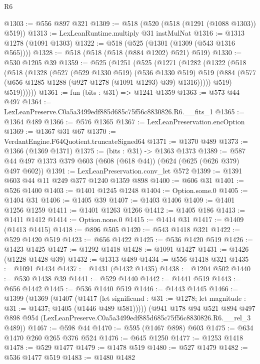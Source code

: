 \begin{lexlean}{R6}
\begin{coremodule}
@1303 := @556 @897 @321
@1309 := @518 (@520 (@518 (@1291 (@1088 @1303)) @519))
@1313 := LexLeanRuntime.multiply @31 instMulNat
@1316 := @1313 @1278 (@1091 @1303)
@1322 := @518 (@525 (@1301 (@1309 (@543 @1316 @565))))
@1328 := @518 (@518 (@518 (@884 @1202) @521) @519)
@1330 := @530 @1205 @39
@1359 := @525
    (@1251
      (@525
        (@1271
          (@1282
            (@1322
              (@518
                (@518
                  (@1328
                    (@527
                      (@529 @1330 @519)
                      (@536 @1330 @519)
                      @519
                      (@884 (@577 (@656 @1285 @1288 (@927 @1278 (@1091 @1293) @39) @1316)))))
                  @519)
                @519))))))
@1361 := fun (bits : @31) => @1241 @1359
@1363 := @573 @44 @497
@1364 := LexLeanPreserve.C0a5a3499edf885d685c75f56c8830826.R6.__fits_1
@1365 := @1364 @489
@1366 := @576 @1365
@1367 := LexLeanPreservation.encOption
@1369 := @1367 @31 @67
@1370 := VerdantEngine.F64Quotient.truncateSigned64
@1371 := @1370 @489
@1373 := @1366 (@1369 @1371)
@1375 := (bits : @31) -> @1363 @1373
@1389 := @587 @44 @497 @1373 @379 @603 (@608 (@618 @44)) (@624 (@625 (@626 @379) @497 @602))
@1391 := LexLeanPreservation.conv_let @572
@1399 := @1391 @603 @44 @11 @249 @377 @1240 @1359 @898
@1400 := @606 @31
@1401 := @526 @1400
@1403 := @1401 @1245 @1248
@1404 := Option.some.{0}
@1405 := @1404 @31
@1406 := @1405 @39
@1407 := @1403 @1406
@1409 := @1401 @1256 @1259
@1411 := @1401 @1263 @1266
@1412 := @1405 @186
@1413 := @1411 @1412
@1414 := Option.none.{0}
@1415 := @1414 @31
@1417 := @1409 (@1413 @1415)
@1418 := @896 @505
@1420 := @543 @1418 @321
@1422 := @529 @1420 @519
@1423 := @656 @1422
@1425 := @536 @1420 @519
@1426 := @1423 @1425
@1427 := @1292 @1418
@1428 := @1091 @1427
@1431 := @1426 (@1228 @1428 @39)
@1432 := @1313 @489
@1434 := @556 @1418 @321
@1435 := @1091 @1434
@1437 := @1431 (@1432 @1435)
@1438 := @1204 @502
@1440 := @530 @1438 @39
@1441 := @529 @1440
@1442 := @1441 @519
@1443 := @656 @1442
@1445 := @536 @1440 @519
@1446 := @1443 @1445
@1466 := @1399
    (@1369
      (@1407
        (@1417
          (let significand : @31 := @1278; let magnitude : @31 := @1437; @1405 (@1446 @489 @581)))))
    (@941
      @178
      @94
      @521
      @894
      @497
      @898
      @954
      (LexLeanPreserve.C0a5a3499edf885d685c75f56c8830826.R6.__rel_3 @489))
@1467 := @598 @44
@1470 := @595 (@1467 @898) @603
@1475 := @634 @1470 @260 @265 @376 @524
@1476 := @645 @1250
@1477 := @1253 @1418
@1478 := @529 @1477
@1479 := @1478 @519
@1480 := @527 @1479
@1482 := @536 @1477 @519
@1483 := @1480 @1482

\end{coremodule}
\end{lexlean}
